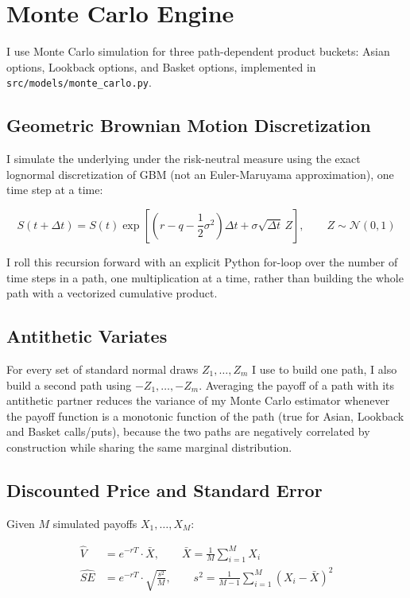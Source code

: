 \documentclass[12pt,a4paper]{article}
\begin{document}
\section{Monte Carlo Engine}

I use Monte Carlo simulation for three path-dependent product buckets:
Asian options, Lookback options, and Basket options, implemented in
\texttt{src/models/monte\_carlo.py}.

\subsection{Geometric Brownian Motion Discretization}

I simulate the underlying under the risk-neutral measure using the exact
lognormal discretization of GBM (not an Euler-Maruyama approximation),
one time step at a time:

\begin{equation}
S(t + \Delta t) = S(t) \exp\left[\left(r - q - \frac{1}{2}\sigma^2\right)\Delta t + \sigma\sqrt{\Delta t}\, Z\right], \qquad Z \sim \mathcal{N}(0,1)
\end{equation}

I roll this recursion forward with an explicit Python for-loop over the
number of time steps in a path, one multiplication at a time, rather than
building the whole path with a vectorized cumulative product.

\subsection{Antithetic Variates}

For every set of standard normal draws $Z_1, \dots, Z_m$ I use to build one
path, I also build a second path using $-Z_1, \dots, -Z_m$. Averaging the
payoff of a path with its antithetic partner reduces the variance of my
Monte Carlo estimator whenever the payoff function is a monotonic function
of the path (true for Asian, Lookback and Basket calls/puts), because the
two paths are negatively correlated by construction while sharing the same
marginal distribution.

\subsection{Discounted Price and Standard Error}

Given $M$ simulated payoffs $X_1, \dots, X_M$:

\begin{align}
\hat{V} &= e^{-rT} \cdot \bar{X}, \qquad \bar{X} = \frac{1}{M}\sum_{i=1}^{M} X_i \\
\widehat{SE} &= e^{-rT} \cdot \sqrt{\frac{s^2}{M}}, \qquad s^2 = \frac{1}{M-1}\sum_{i=1}^M (X_i - \bar{X})^2
\end{align}
\end{document}
